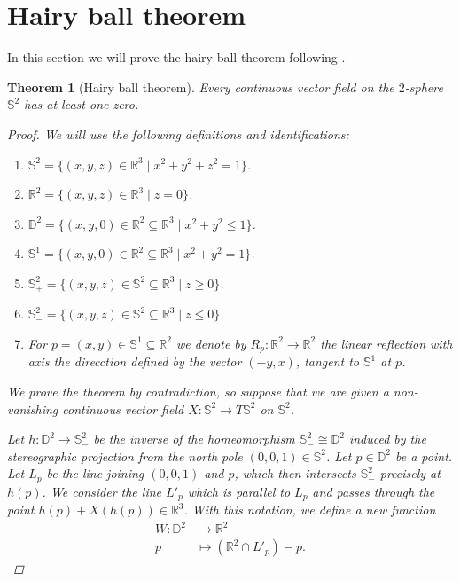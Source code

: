 \documentclass[A4paper, 12pt, british, reqno]{amsart}
\newcommand{\bbD}{\mathbb{D}}
\newcommand{\R}{\mathbb{R}} %
\newcommand{\bbS}{\mathbb{S}}
\theoremstyle{plain}
\newtheorem{thm}{Theorem}[section]
\theoremstyle{definition}
\theoremstyle{remark}
\theoremstyle{plain}
\theoremstyle{definition}
\theoremstyle{remark}
\theoremstyle{plain}
\theoremstyle{definition}
\theoremstyle{remark}
\begin{document}
\section{Hairy ball theorem}

In this section we will prove the hairy ball theorem following \cite{eg79}.

\begin{thm}[Hairy ball theorem]
    Every continuous vector field on the $2$-sphere $\bbS^{2}$ has at least one zero.
    \begin{proof}
	We will use the following definitions and identifications:
	\begin{enumerate}[label=\textbullet]
	    \item $\bbS^{2}=\{ (x,y,z)\in \R^{3}\mid x^{2}+y^{2}+z^{2}=1 \}$.
	    \item $\R^{2}=\{ (x,y,z)\in \R^{3}\mid z=0 \}$.
	    \item $\bbD^{2}=\{ (x,y,0)\in \R^{2}\subseteq \R^{3}\mid x^{2}+y^{2}\leqslant 1 \}$.
	    \item $\bbS^{1}=\{ (x,y,0)\in \R^{2}\subseteq \R^{3}\mid x^{2}+y^{2}=1\}$.
	    \item $\bbS^{2}_{+}=\{ (x,y,z)\in \bbS^{2}\subseteq \R^{3}\mid z\geqslant 0 \}$.
	    \item $\bbS^{2}_{-}=\{ (x,y,z)\in \bbS^{2}\subseteq \R^{3}\mid z\leqslant 0 \}$.
	    \item For $p=(x,y)\in \bbS^{1}\subseteq \R^{2}$ we denote by $R_{p}\colon \R^{2}\to \R^{2}$ the linear reflection with axis the direcction defined by the vector $(-y,x)$, tangent to $\bbS^{1}$ at $p$.
	\end{enumerate}

	We prove the theorem by contradiction, so suppose that we are given a non-vanishing continuous vector field $X\colon \bbS^{2}\to T\bbS^{2}$ on $\bbS^{2}$.

	Let $h\colon \bbD^{2}\to \bbS^{2}_{-}$ be the inverse of the homeomorphism $\bbS^{2}_{-}\cong\bbD^{2}$ induced by the stereographic projection from the north pole $(0,0,1)\in \bbS^{2}$.
	Let $p\in \bbD^{2}$ be a point.
	Let $L_{p}$ be the line joining $(0,0,1)$ and $p$, which then intersects $\bbS^{2}_{-}$ precisely at $h(p)$.
	We consider the line $L'_{p}$ which is parallel to $L_{p}$ and passes through the point $h(p)+X(h(p))\in \R^{3}$.
	With this notation, we define a new function
	\begin{align*}
	    W\colon \bbD^{2} &\longrightarrow \R^{2} \\
	    p & \longmapsto (\R^{2}\cap L'_{p})-p.
	\end{align*}


\end{proof}
\end{thm}
\end{document}
